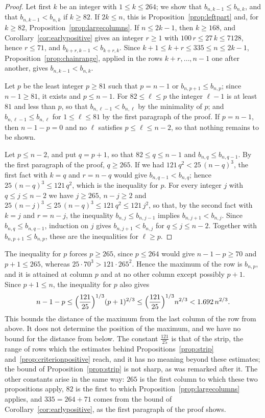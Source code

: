 \documentclass{amsart}
\theoremstyle{definition}
\theoremstyle{remark}
\numberwithin{equation}{section}
\begin{document}
\begin{proof}
Let first $k$ be an integer with $1\le k\le 264$; we show that $b_{n,k-1}\le b_{n,k}$, and that $b_{n,k-1}<b_{n,k}$ if $k\ge 82$. If $2k\le n$, this is Proposition~\ref{prop:leftpart} and, for $k\ge 82$, Proposition~\ref{prop:largecolumns}. If $n\le 2k-1$, then $k\ge 168$, and Corollary~\ref{cor:earlypositive} gives an integer $r\ge 1$ with $100\,r\le 27\,k\le 7128$, hence $r\le 71$, and $b_{k+r,k-1}<b_{k+r,k}$. Since $k+1\le k+r\le 335\le n\le 2k-1$, Proposition~\ref{prop:chainrange}, applied in the rows $k+r,\dots,n-1$ one after another, gives $b_{n,k-1}<b_{n,k}$.

Let $p$ be the least integer $p\ge 81$ such that $p=n-1$ or $b_{n,p+1}\le b_{n,p}$; since $n-1\ge 81$, it exists and $p\le n-1$. For $82\le\ell\le p$ the integer $\ell-1$ is at least $81$ and less than $p$, so that $b_{n,\ell-1}<b_{n,\ell}$ by the minimality of $p$; and $b_{n,\ell-1}\le b_{n,\ell}$ for $1\le\ell\le 81$ by the first paragraph of the proof. If $p=n-1$, then $n-1-p=0$ and no $\ell$ satisfies $p\le\ell\le n-2$, so that nothing remains to be shown.

Let $p\le n-2$, and put $q=p+1$, so that $82\le q\le n-1$ and $b_{n,q}\le b_{n,q-1}$. By the first paragraph of the proof, $q\ge 265$. If we had $121\,q^2<25\,(n-q)^3$, the first fact with $k=q$ and $r=n-q$ would give $b_{n,q-1}<b_{n,q}$; hence $25\,(n-q)^3\le 121\,q^2$, which is the inequality for $p$. For every integer $j$ with $q\le j\le n-2$ we have $j\ge 265$, $n-j\ge 2$ and $25\,(n-j)^3\le 25\,(n-q)^3\le 121\,q^2\le 121\,j^2$, so that, by the second fact with $k=j$ and $r=n-j$, the inequality $b_{n,j}\le b_{n,j-1}$ implies $b_{n,j+1}<b_{n,j}$. Since $b_{n,q}\le b_{n,q-1}$, induction on $j$ gives $b_{n,j+1}<b_{n,j}$ for $q\le j\le n-2$. Together with $b_{n,p+1}\le b_{n,p}$, these are the inequalities for $\ell\ge p$.
\end{proof}

The inequality for $p$ forces $p\ge 265$, since $p\le 264$ would give $n-1-p\ge 70$ and $p+1\le 265$, whereas $25\cdot 70^3>121\cdot 265^2$. Hence the maximum of the row is $b_{n,p}$, and it is attained at column $p$ and at no other column except possibly $p+1$. Since $p+1\le n$, the inequality for $p$ also gives
\[
n-1-p\le\Bigl(\frac{121}{25}\Bigr)^{1/3}(p+1)^{2/3}\le\Bigl(\frac{121}{25}\Bigr)^{1/3}n^{2/3}<1.692\,n^{2/3}.
\]
This bounds the distance of the maximum from the last column of the row from above. It does not determine the position of the maximum, and we have no bound for the distance from below. The constant $\frac{121}{25}$ is that of the strip, the range of rows which the estimates behind Propositions~\ref{prop:strip} and~\ref{prop:criterionpositive} reach, and it has no meaning beyond these estimates; the bound of Proposition~\ref{prop:strip} is not sharp, as was remarked after it. The other constants arise in the same way: $265$ is the first column to which these two propositions apply, $82$ is the first to which Proposition~\ref{prop:largecolumns} applies, and $335=264+71$ comes from the bound of Corollary~\ref{cor:earlypositive}, as the first paragraph of the proof shows.



\end{document}
